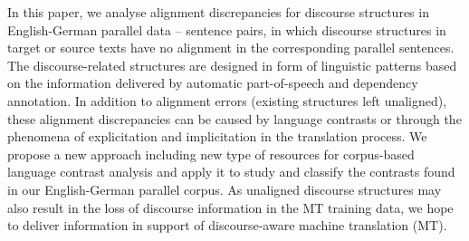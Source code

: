 In this paper, we analyse alignment discrepancies  for discourse structures in English-German parallel data -- sentence pairs, in which discourse structures in target or source texts have no alignment in the corresponding parallel sentences. The discourse-related structures are designed in form of linguistic patterns based on the information delivered by automatic part-of-speech and dependency annotation. In addition to alignment errors (existing structures left unaligned), these alignment discrepancies can be caused by language contrasts or through the phenomena of explicitation and implicitation in the translation process. We propose a new approach including new type of resources for corpus-based language contrast analysis and apply it to study and classify the contrasts found in our English-German parallel corpus. As unaligned discourse structures may also result in the loss of discourse information in the MT training data, we hope to deliver information in support of discourse-aware machine translation (MT).
